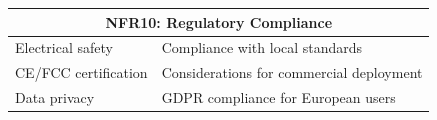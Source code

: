 \begin{center}
\begin{longtable}{|p{3.5cm}|p{10cm}|}
\multicolumn{2}{|c|}{\textbf{NFR10: Regulatory Compliance}} \\
\hline
Electrical safety & Compliance with local standards \\
\hline
CE/FCC certification & Considerations for commercial deployment \\
\hline
Data privacy & GDPR compliance for European users \\
\hline

\end{longtable}
\end{center}

